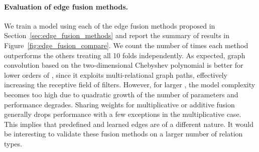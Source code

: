 \documentclass[final,nonatbib]{article} \usepackage{nips_2018}
\begin{document}
	\paragraph{Evaluation of edge fusion methods.}
	We train a model using each of the edge fusion methods proposed in Section~\ref{sec:edge_fusion_methods} and report the summary of results in Figure~\ref{fig:edge_fusion_compare}. We count the number of times each method outperforms the others treating all 10 folds independently.
	As expected, graph convolution based on the two-dimensional Chebyshev polynomial is better for lower orders of , since it exploits multi-relational graph paths, effectively increasing the receptive field of filters.
	However, for larger , the model complexity becomes too high due to quadratic growth of the number of parameters and performance degrades.
	Sharing weights for multiplicative or additive fusion generally drops performance with a few exceptions in the multiplicative case. This implies that predefined and learned edges are of a different nature. It would be interesting to validate these fusion methods on a larger number of relation types.
\end{document}
